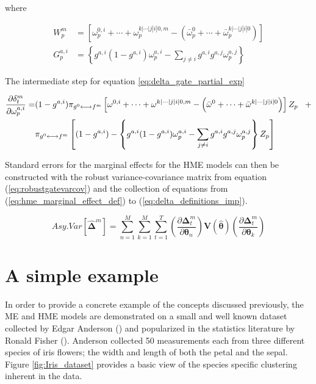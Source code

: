 \documentclass[12pt]{article}
\newcommand{\mean}[1]{\bar{#1}}
\newcommand{\gateprod}[2]{\pi_{#1 \longleftrightarrow #2}}
\begin{document}
where

\begin{align}
    W^{m}_{p}     &= \left[ \omega^{0, i}_{p} + \cdots + \omega^{k|\cdots|j|i|0, m}_{p} - \left( \mean{\omega}^{0}_{p} + \cdots + \mean{\omega}^{k|\cdots|j|i|0}_{p} \right) \right] \\
    G^{a,i}_{p} &= \left\{ g^{a,i} (1 - g^{a,i}) \omega^{a,i}_{p} - \sum_{j \neq i} g^{a,i} g^{a,j} \omega^{a,j}_{p} \right\}
\end{align}

The intermediate step for equation \ref{eq:delta_gate_partial_exp}

\begin{equation}
  \begin{split} \notag
    \frac{\partial \delta^{m}_{t}}{\partial \omega^{a,i}_{p}} =& (1 - g^{a,i})  \gateprod{g^{0}}{f^{m}}  \left[ \omega^{0, i} + \cdots + \omega^{k|\cdots|j|i|0, m} - \left( \mean{\omega}^{0} + \cdots + \mean{\omega}^{k|\cdots|j|i|0} \right) \right] Z_{p} \,\,\,\,\, + \\ 
    &\gateprod{g^{0}}{f^{m}} \left[ (1 - g^{a,i})  - \left\{ g^{a,i} (1 - g^{a,i}) \omega^{a,i}_{p} - \sum_{j \neq i} g^{a,i} g^{a,j} \omega^{a,j}_{p} \right\}  Z_{p}  \right]
  \end{split} 
\end{equation}

Standard errors for the marginal effects for the HME models can then be
constructed with the robust variance-covariance matrix from equation
(\ref{eq:robustgatevarcov}) and the collection of equations from
(\ref{eq:hme_marginal_effect_def}) to (\ref{eq:delta_definitions_imp}).


\begin{equation}
  Asy.Var \left[ \boldsymbol{ \hat{ \Delta } }^{m} \right] = \sum^{M}_{n=1} \sum^{M}_{k=1} \sum^{T}_{t=1}     \left(\frac{\partial \boldsymbol{\Delta}^{m}_{t}}{\partial \boldsymbol{\theta}_{n}} \right)     \boldsymbol{V}(\boldsymbol{\hat{\theta}})      \left(\frac{\partial \boldsymbol{\Delta}^{m}_{t}}{\partial \boldsymbol{\theta}_{k}} \right)
\end{equation}





\section{A simple example} \label{sec:SimpleExample}

In order to provide a concrete example of the concepts discussed previously,
the ME and HME models are demonstrated on a small and well known dataset
collected by Edgar Anderson (\cite{Anderson1936}) and popularized in the
statistics literature by Ronald Fisher (\cite{Fisher1936}). Anderson collected
50 measurements each from three different species of iris flowers; the width and
length of both the petal and the sepal. Figure \ref{fig:Iris_dataset} provides a
basic view of the species specific clustering inherent in the data.
\end{document}
